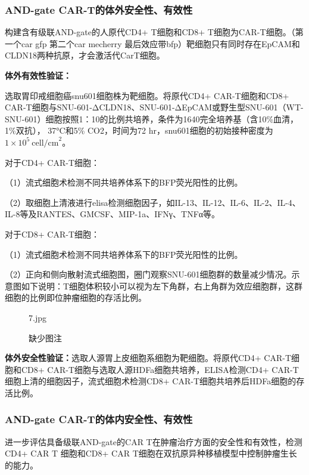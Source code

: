 \documentclass[12pt]{article}
\begin{document}
\subsubsection{AND-gate CAR-T的体外安全性、有效性}

构建含有级联AND-gate的人原代CD4+ T细胞和CD8+ T细胞为CAR-T细胞。（第一个car gfp 第二个car mecherry 最后效应带bfp）靶细胞只有同时存在EpCAM和CLDN18两种抗原，才会激活代CarT细胞。

\textbf{体外有效性验证：}

选取胃印戒细胞癌snu601细胞株为靶细胞。将原代CD4+ CAR-T细胞和CD8+ CAR-T细胞与SNU-601-ΔCLDN18、SNU-601-ΔEpCAM或野生型SNU-601（WT- SNU-601）细胞按照1：10的比例共培养，条件为1640完全培养基（含10\%血清，1\%双抗）， 37°C和5\% CO2，时间为72 hr，snu601细胞的初始接种密度为$1\times 10^5 \ \mathrm{cell / cm}^2$。

对于CD4+ CAR-T细胞：

（1）流式细胞术检测不同共培养体系下的BFP荧光阳性的比例。

（2）取细胞上清液进行elisa检测细胞因子，如IL-13、IL-12、IL-6、IL-2、IL-4、IL-8等及RANTES、GMCSF、MIP-1a、IFNγ、TNFα等。 

对于CD8+ CAR-T细胞：

（1）流式细胞术检测不同共培养体系下的BFP荧光阳性的比例。

（2）正向和侧向散射流式细胞图，圈门观察SNU-601细胞群的数量减少情况。示意图如下说明：T细胞体积较小可以视为左下角群，右上角群为效应细胞群，这群细胞的比例即位肿瘤细胞的存活比例。

\begin{figure}[h]
	\centering
	\begin{overpic}[width=0.6\columnwidth]{7.jpg}
	\end{overpic}
	\caption{缺少图注}
	\label{6}
	
\end{figure}


\textbf{体外安全性验证：}选取人源胃上皮细胞系细胞为靶细胞。将原代CD4+ CAR-T细胞和CD8+ CAR-T细胞与选取人源HDFa细胞共培养，ELISA检测CD4+ CAR-T细胞上清的细胞因子，流式细胞术检测CD8+ CAR-T细胞共培养后HDFa细胞的存活比例。

\subsubsection{AND-gate CAR-T的体内安全性、有效性}

进一步评估具备级联AND-gate的CAR T在肿瘤治疗方面的安全性和有效性，检测CD4+ CAR T 细胞和CD8+ CAR T细胞在双抗原异种移植模型中控制肿瘤生长的能力。
\end{document}
